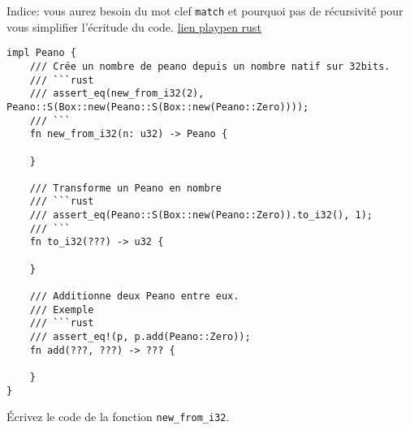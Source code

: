 \documentclass[11pt,a4paper,addpoint,answers]{exam}
\begin{document}
\begin{questions}
Indice: vous aurez besoin du mot clef \texttt{match} et pourquoi pas de récursivité pour vous simplifier l'écritude du code.
\href{https://play.rust-lang.org/?version=stable&mode=debug&edition=2018&code=use%20std%3A%3Aboxed%3A%3ABox%3B%0A%0Aenum%20Peano%20%7B%0A%20%20%20%20Zero%2C%0A%20%20%20%20S(Box%3CPeano%3E)%0A%7D%0A%0Aimpl%20Peano%20%7B%0A%20%20%20%20%2F%2F%2F%20Cr%C3%A9e%20un%20nombre%20de%20peano%20depuis%20un%20nombre%20natif%20sur%2032bits.%0A%20%20%20%20%2F%2F%2F%20%60%60%60rust%0A%20%20%20%20%2F%2F%2F%20assert_eq(new_from_i32(2)%2C%20Peano%3A%3AS(Box%3A%3Anew(Peano%3A%3AS(Box%3A%3Anew(Peano%3A%3AZero))))%3B%0A%20%20%20%20%2F%2F%2F%20%60%60%60%0A%20%20%20%20fn%20new_from_i32(n%3A%20u32)%20-%3E%20Peano%20%7B%0A%20%20%20%20%20%20%20%20%0A%20%20%20%20%7D%0A%20%20%20%20%0A%20%20%20%20%2F%2F%2F%20Transforme%20un%20Peano%20en%20nombre%0A%20%20%20%20%2F%2F%2F%20%60%60%60rust%0A%20%20%20%20%2F%2F%2F%20assert_eq(Peano%3A%3AS(Box%3A%3Anew(Peano%3A%3AZero)).to_i32()%2C%201)%3B%0A%20%20%20%20%2F%2F%2F%20%60%60%60%0A%20%20%20%20fn%20to_i32(%3F%3F%3F)%20-%3E%20u32%20%7B%0A%20%20%20%20%20%20%20%20%0A%20%20%20%20%7D%0A%20%20%20%20%0A%20%20%20%20%2F%2F%2F%20Additionne%20deux%20Peano%20entre%20eux.%0A%20%20%20%20%2F%2F%2F%20Exemple%0A%20%20%20%20%2F%2F%2F%20%60%60%60rust%0A%20%20%20%20%2F%2F%2F%20assert_eq!(p%2C%20p.add(Peano%3A%3AZero))%3B%0A%20%20%20%20fn%20add(%3F%3F%3F%2C%20%3F%3F%3F)%20-%3E%20%3F%3F%3F%20%7B%0A%0A%20%20%20%20%7D%0A%7D%0A%0Afn%20main()%20%7B%0A%20%20%20%20let%20z%20%3D%20Peano%3A%3AZero%3B%0A%20%20%20%20let%20h%20%3D%20Peano%3A%3AS(Box%3A%3Anew(Peano%3A%3AZero))%3B%0A%7D}{lien playpen rust}
\begin{verbatim}
impl Peano {
    /// Crée un nombre de peano depuis un nombre natif sur 32bits.
    /// ```rust
    /// assert_eq(new_from_i32(2), Peano::S(Box::new(Peano::S(Box::new(Peano::Zero))));
    /// ```
    fn new_from_i32(n: u32) -> Peano {

    }

    /// Transforme un Peano en nombre
    /// ```rust
    /// assert_eq(Peano::S(Box::new(Peano::Zero)).to_i32(), 1);
    /// ```
    fn to_i32(???) -> u32 {

    }

    /// Additionne deux Peano entre eux.
    /// Exemple
    /// ```rust
    /// assert_eq!(p, p.add(Peano::Zero));
    fn add(???, ???) -> ??? {

    }
}
\end{verbatim}
\question[1] Écrivez le code de la fonction \texttt{new_from_i32}.


\end{questions}
\end{document}
